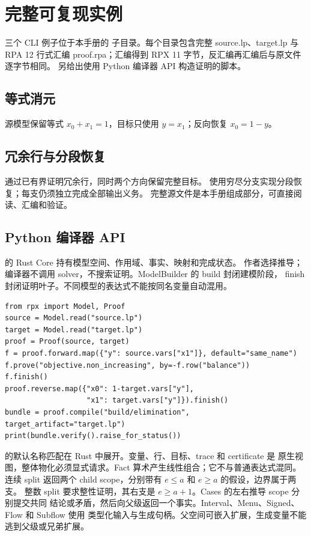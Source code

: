 \chapter{完整可复现实例}
\label{ch:examples}

三个 CLI 例子位于本手册的  子目录。每个目录包含完整 source.lp、target.lp
与 RPA 12 行式汇编 proof.rpa；汇编得到 RPX 11 字节，反汇编再汇编后与原文件逐字节相同。
 另给出使用 Python 编译器 API 构造证明的脚本。

\section{等式消元}
源模型保留等式 $x_0+x_1=1$，目标只使用 $y=x_1$；反向恢复 $x_0=1-y$。

\section{冗余行与分段恢复}
 通过已有界证明冗余行，同时两个方向保留完整目标。
 使用穷尽分支实现分段恢复；每支仍须独立完成全部输出义务。
完整源文件是本手册组成部分，可直接阅读、汇编和验证。

\section{Python 编译器 API}
 的 Rust Core 持有模型空间、作用域、事实、映射和完成状态。
作者选择推导；编译器不调用 solver，不搜索证明。ModelBuilder 的 build 封闭建模阶段，
finish 封闭证明叶子。不同模型的表达式不能按同名变量自动混用。

\begin{lstlisting}
from rpx import Model, Proof
source = Model.read("source.lp")
target = Model.read("target.lp")
proof = Proof(source, target)
f = proof.forward.map({"y": source.vars["x1"]}, default="same_name")
f.prove("objective.non_increasing", by=-f.row("balance"))
f.finish()
proof.reverse.map({"x0": 1-target.vars["y"],
                   "x1": target.vars["y"]}).finish()
bundle = proof.compile("build/elimination", target_artifact="target.lp")
print(bundle.verify().raise_for_status())
\end{lstlisting}

 的默认名称匹配在 Rust 中展开。变量、行、目标、trace 和 certificate 是
原生视图，整体物化必须显式请求。Fact 算术产生线性组合；它不与普通表达式混同。
连续 split 返回两个 child scope，分别带有 $e\le a$ 和 $e\ge a$ 的假设，边界属于两支。
整数 split 要求整性证明，其右支是 $e\ge a+1$。Cases 的左右推导 scope 分别提交共同
结论或矛盾，然后向父级返回一个事实。Interval、Menu、Signed、Flow 和 Subflow 使用
类型化输入与生成句柄。父空间可嵌入扩展，生成变量不能逃到父级或兄弟扩展。

